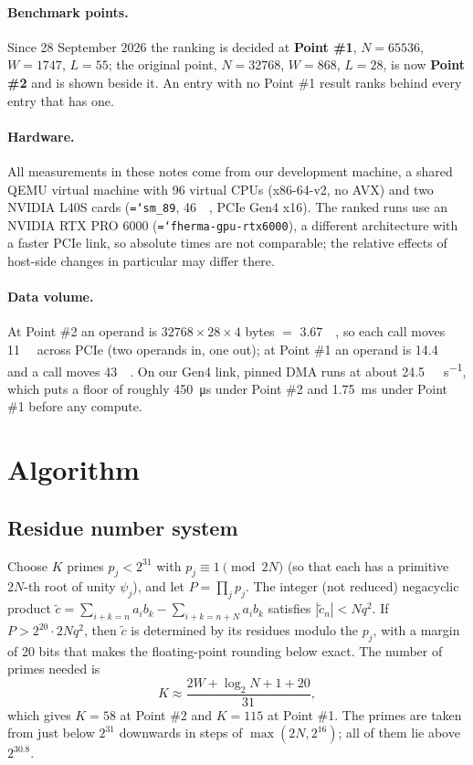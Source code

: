 \documentclass[11pt,a4paper]{article}
\newcommand{\code}[1]{\texttt{\hyphenchar\font=`\-\relax #1}}
\newcommand{\us}[1]{\SI{#1}{\micro\second}}
\newcommand{\ms}[1]{\SI{#1}{\milli\second}}
\newcommand{\MB}[1]{\SI{#1}{\mega\byte}}
\begin{document}
\paragraph{Benchmark points.} Since 28 September 2026 the ranking is decided at
\textbf{Point \#1}, $N = 65536$, $W = 1747$, $L = 55$; the original point,
$N = 32768$, $W = 868$, $L = 28$, is now \textbf{Point \#2} and is shown beside it.
An entry with no Point \#1 result ranks behind every entry that has one.

\paragraph{Hardware.} All measurements in these notes come from our development
machine, a shared QEMU virtual machine with 96 virtual CPUs (x86-64-v2, no AVX) and
two NVIDIA L40S cards (\code{sm\_89}, \SI{46}{\giga\byte}, PCIe Gen4 x16). The
ranked runs use an NVIDIA RTX PRO 6000 (\code{fherma-gpu-rtx6000}), a different
architecture with a faster PCIe link, so absolute times are not comparable; the
relative effects of host-side changes in particular may differ there.

\paragraph{Data volume.} At Point \#2 an operand is $32768 \times 28 \times 4$ bytes
$=$ \MB{3.67}, so each call moves \MB{11} across PCIe (two operands in, one out);
at Point \#1 an operand is \MB{14.4} and a call moves \MB{43}. On our Gen4 link,
pinned DMA runs at about \SI{24.5}{\giga\byte\per\second}, which puts a floor of
roughly \us{450} under Point \#2 and \ms{1.75} under Point \#1 before any compute.

\section{Algorithm}

\subsection{Residue number system}
Choose $K$ primes $p_j < 2^{31}$ with $p_j \equiv 1 \pmod{2N}$ (so that each has a
primitive $2N$-th root of unity $\psi_j$), and let $P = \prod_j p_j$. The integer
(not reduced) negacyclic product $\tilde c = \sum_{i+k=n} a_i b_k - \sum_{i+k=n+N} a_i b_k$
satisfies $|\tilde c_n| < N q^2$. If $P > 2^{20} \cdot 2N q^2$, then $\tilde c$ is
determined by its residues modulo the $p_j$, with a margin of 20 bits that makes the
floating-point rounding below exact. The number of primes needed is
\[
  K \approx \frac{2W + \log_2 N + 1 + 20}{31},
\]
which gives $K = 58$ at Point \#2 and $K = 115$ at Point \#1. The primes are taken
from just below $2^{31}$ downwards in steps of $\max(2N, 2^{16})$; all of them lie
above $2^{30.8}$.
\end{document}
